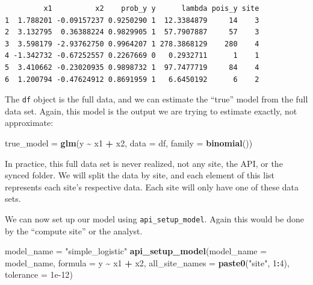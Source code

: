 \documentclass[]{elsarticle} %
\newenvironment{Shaded}{\begin{snugshade}}{\end{snugshade}}
\newcommand{\DataTypeTok}[1]{\textcolor[rgb]{0.13,0.29,0.53}{#1}}
\newcommand{\DecValTok}[1]{\textcolor[rgb]{0.00,0.00,0.81}{#1}}
\newcommand{\FloatTok}[1]{\textcolor[rgb]{0.00,0.00,0.81}{#1}}
\newcommand{\KeywordTok}[1]{\textcolor[rgb]{0.13,0.29,0.53}{\textbf{#1}}}
\newcommand{\NormalTok}[1]{#1}
\newcommand{\OperatorTok}[1]{\textcolor[rgb]{0.81,0.36,0.00}{\textbf{#1}}}
\newcommand{\StringTok}[1]{\textcolor[rgb]{0.31,0.60,0.02}{#1}}
\begin{document}
\begin{verbatim}
         x1          x2    prob_y y      lambda pois_y site
1  1.788201 -0.09157237 0.9250290 1  12.3384879     14    3
2  3.132795  0.36388224 0.9829905 1  57.7907887     57    3
3  3.598179 -2.93762750 0.9964207 1 278.3868129    280    4
4 -1.342732 -0.67252557 0.2267669 0   0.2932711      1    1
5  3.410662 -0.23020935 0.9898732 1  97.7477719     84    4
6  1.200794 -0.47624912 0.8691959 1   6.6450192      6    2
\end{verbatim}

The \texttt{df} object is the full data, and we can estimate the ``true'' model from the full data set. Again, this model is the output we are trying to estimate exactly, not approximate:

\begin{Shaded}
\begin{Highlighting}[]
\NormalTok{true\_model =}\StringTok{ }\KeywordTok{glm}\NormalTok{(y }\OperatorTok{\textasciitilde{}}\StringTok{ }\NormalTok{x1 }\OperatorTok{+}\StringTok{ }\NormalTok{x2, }\DataTypeTok{data =}\NormalTok{ df, }\DataTypeTok{family =} \KeywordTok{binomial}\NormalTok{())}
\end{Highlighting}
\end{Shaded}

In practice, this full data set is never realized, not any site, the API, or the synced folder. We will split the data by site, and each element of this list represents each site's respective data. Each site will only have one of these data sets.

\begin{Shaded}
\end{Shaded}

We can now set up our model using \texttt{api\_setup\_model}. Again this would be done by the ``compute site'' or the analyst.

\begin{Shaded}
\begin{Highlighting}[]
\NormalTok{model\_name =}\StringTok{ "simple\_logistic"}
\KeywordTok{api\_setup\_model}\NormalTok{(}\DataTypeTok{model\_name =}\NormalTok{ model\_name, }\DataTypeTok{formula =}\NormalTok{ y }\OperatorTok{\textasciitilde{}}\StringTok{ }\NormalTok{x1 }\OperatorTok{+}\StringTok{ }\NormalTok{x2,}
                \DataTypeTok{all\_site\_names =} \KeywordTok{paste0}\NormalTok{(}\StringTok{"site"}\NormalTok{, }\DecValTok{1}\OperatorTok{:}\DecValTok{4}\NormalTok{), }\DataTypeTok{tolerance =} \FloatTok{1e{-}12}\NormalTok{)}
\end{Highlighting}
\end{Shaded}
\end{document}
